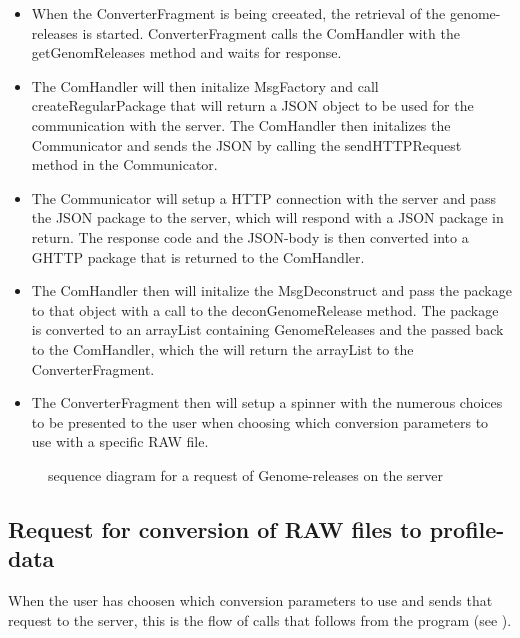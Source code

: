     \begin{itemize}
    	
        \item
        	When the ConverterFragment is being creeated, the retrieval of the genome-releases is started. ConverterFragment calls the ComHandler with the getGenomReleases method and waits for response.
       	\item
        	The ComHandler will then initalize MsgFactory and call createRegularPackage that will return a JSON object to be used for the communication with the server. The ComHandler then initalizes the Communicator and sends the JSON by calling the sendHTTPRequest method in the Communicator.
      	\item
        	The Communicator will setup a HTTP connection with the server and pass the JSON package to the server, which will respond with a JSON package in return. The response code and the JSON-body is then converted into a GHTTP package that is returned to the ComHandler.
       	\item
        	The ComHandler then will initalize the MsgDeconstruct and pass the package to that object with a call to the deconGenomeRelease method. The package is converted to an arrayList containing GenomeReleases and the passed back to the ComHandler, which the will return the arrayList to the ConverterFragment.
      	\item
        	The ConverterFragment then will setup a spinner with the numerous choices to be presented to the user when choosing which conversion parameters to use with a specific RAW file.
    
    \end{itemize}
    
    \begin{figure}
        \caption{sequence diagram for a request of Genome-releases on the server}
        \label{fig:and_genomeseq}
    \end{figure}
\FloatBarrier

    
\subsection{Request for conversion of RAW files to profile-data}
	When the user has choosen which conversion parameters to use and sends that request to the server, this is the flow of calls that follows from the program (see ).
    
